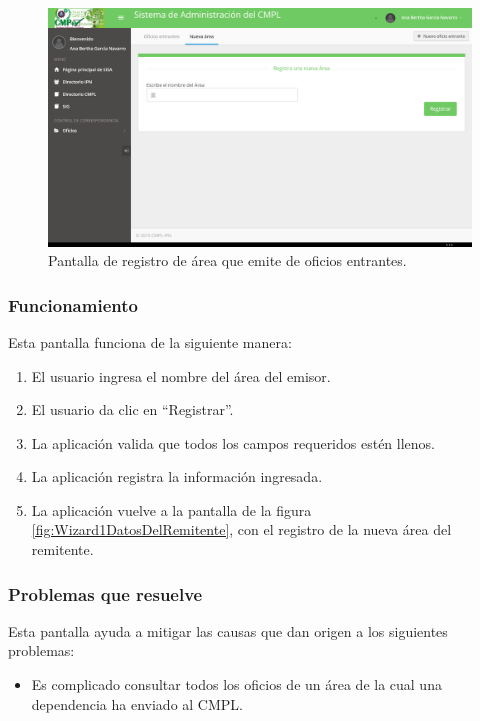 	\begin{figure}[htbp!]
		\centering
			\includegraphics[width=1\textwidth]{Pantallas/NuevaAreaEmisor.png}
		\caption{Pantalla de registro de área que emite de oficios entrantes.}
		\label{fig:NuevaAreaEmisor}
	\end{figure}

\subsubsection{Funcionamiento}
	Esta pantalla funciona de la siguiente manera:
	
	\begin{enumerate}
		\item El usuario ingresa el nombre del área del emisor.
		\item El usuario da clic en ``Registrar''.
		\item La aplicación valida que todos los campos requeridos estén llenos.
		\item La aplicación registra la información ingresada.
		\item La aplicación vuelve a la pantalla de la figura \ref{fig:Wizard1DatosDelRemitente}, con el registro de la nueva área del remitente.
	\end{enumerate}

\subsubsection{Problemas que resuelve}
Esta pantalla ayuda a mitigar las causas que dan origen a los siguientes problemas:

	\begin{itemize}
		\item Es complicado consultar todos los oficios de un área de la cual una dependencia ha enviado al CMPL.
	\end{itemize}

